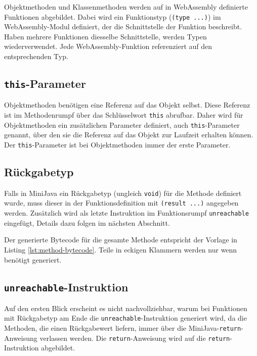 Objektmethoden und Klassenmethoden werden auf in WebAssembly definierte Funktionen abgebildet. Dabei wird ein Funktionstyp (\lstinline{(type ...)}) im WebAssembly-Modul definiert, der die Schnittstelle der Funktion beschreibt. Haben mehrere Funktionen diesselbe Schnittstelle, werden Typen wiederverwendet. Jede WebAssembly-Funktion referenziert auf den entsprechenden Typ.

\subsection{\lstinline{this}-Parameter}
Objektmethoden benötigen eine Referenz auf das Objekt selbst. Diese Referenz ist im Methodenrumpf über das Schlüsselwort \lstinline{this} abrufbar. Daher wird für Objektmethoden ein zusätzlichen Parameter definiert, auch \lstinline{this}-Parameter genannt, über den sie die Referenz auf das Objekt zur Laufzeit erhalten können. Der \lstinline{this}-Parameter ist bei Objektmethoden immer der erste Parameter.

\subsection{Rückgabetyp}
Falls in MiniJava ein Rückgabetyp (ungleich \lstinline{void}) für die Methode definiert wurde, muss dieser in der Funktionsdefinition mit \lstinline{(result ...)} angegeben werden. Zusätzlich wird als letzte Instruktion im Funktionsrumpf \lstinline{unreachable} eingefügt, Details dazu folgen im nächsten Abschnitt.

Der generierte Bytecode für die gesamte Methode entspricht der Vorlage in Listing \ref{lst:method-bytecode}. Teile in eckigen Klammern werden nur wenn benötigt generiert.



\subsection{\lstinline{unreachable}-Instruktion}
Auf den ersten Blick erscheint es nicht nachvollziehbar, warum bei Funktionen mit Rückgabetyp am Ende die \lstinline{unreachable}-Instruktion generiert wird, da die Methoden, die einen Rückgabewert liefern, immer über die MiniJava-\lstinline{return}-Anweisung verlassen werden. Die \lstinline{return}-Anweisung wird auf die \lstinline{return}-Instruktion abgebildet.


